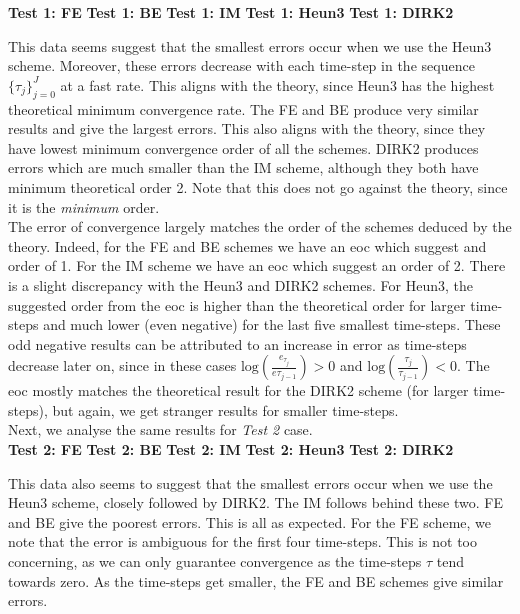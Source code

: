 \documentclass[10pt]{article}
\begin{document}
\textbf{Test 1: FE}
\textbf{Test 1: BE}
\textbf{Test 1: IM}
\textbf{Test 1: Heun3}
\textbf{Test 1: DIRK2}

This data seems suggest that the smallest errors occur when we use the Heun3 scheme. Moreover, these errors decrease with each time-step in the sequence $\{\tau_j\}_{j=0}^{J}$ at a fast rate. This aligns with the theory, since Heun3 has the highest theoretical minimum convergence rate. The FE and BE produce very similar results and give the largest errors. This also aligns with the theory, since they have lowest minimum convergence order of all the schemes. DIRK2 produces errors which are much smaller than the IM scheme, although they both have minimum theoretical order 2. Note that this does not go against the theory, since it is the \textit{minimum} order.\\

The error of convergence largely matches the order of the schemes deduced by the theory. Indeed, for the FE and BE schemes we have an eoc which suggest and order of 1. For the IM scheme we have an eoc which suggest an order of 2. There is a slight discrepancy with the Heun3 and DIRK2 schemes. For Heun3, the suggested order from the eoc is higher than the theoretical order for larger time-steps and much lower (even negative) for the last five smallest time-steps. These odd negative results can be attributed to an increase in error as time-steps decrease later on, since in these cases $\text{log}( \frac{e_{\tau_j} }{ e{\tau_{j-1}} }) > 0$ and $\text{log}(\frac{\tau_j}{\tau_{j-1}}) < 0$. The eoc mostly matches the theoretical result for the DIRK2 scheme (for larger time-steps), but again, we get stranger results for smaller time-steps.\\

Next, we analyse the same results for \textit{Test 2} case.\\


\textbf{Test 2: FE}
\textbf{Test 2: BE}
\textbf{Test 2: IM}
\textbf{Test 2: Heun3}
\textbf{Test 2: DIRK2}

This data also seems to suggest that the smallest errors occur when we use the Heun3 scheme, closely followed by DIRK2. The IM follows behind these two. FE and BE give the poorest errors. This is all as expected. For the FE scheme, we note that the error is ambiguous for the first four time-steps. This is not too concerning, as we can only guarantee convergence as the time-steps $\tau$ tend towards zero. As the time-steps get smaller, the FE and BE schemes give similar errors.
\end{document}
